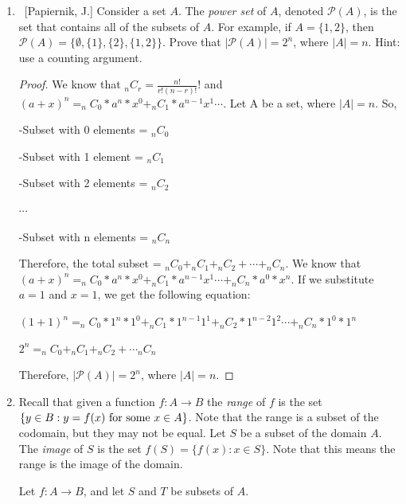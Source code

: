 \documentclass[10pt]{article}
\begin{document}
\begin{enumerate}
\item  ~[Papiernik, J.] Consider a set $A$.  The \emph{power set} of $A$, denoted $\mathcal{P}(A)$, is the set that contains all of the subsets of $A$.  For example, if $A = \{ 1, 2 \}$, then $\mathcal{P}(A) = \{ \emptyset, \{1\}, \{2\}, \{1,2\} \}$.  Prove that $|\mathcal{P}(A)| = 2^n$, where $|A| = n$.  Hint: use a counting argument.
\begin{proof}
We know that $_n C_r = \frac{n!}{r!(n-r)!}!$ and $(a+x)^n = _n C_0*a^n*x^0+_n C_1*a^{n-1}x^1 \cdots$.  Let A be a set, where $|A| = n$.  So, 
\begin{center}
\par \medskip
-Subset with 0 elements = $_n C_0$
\par \medskip
-Subset with 1 element = $_n C_1$
\par \medskip
-Subset with 2 elements = $_n C_2$
\par \medskip
$\cdots$
\par \medskip
-Subset with n elements = $_n C_n$
\par \medskip
\end{center}
Therefore, the total subset = $_n C_0 + _n C_1 + _n C_2 + \cdots + _n C_n$.  We know that $(a+x)^n = _n C_0*a^n*x^0+_n C_1*a^{n-1}x^1 \cdots + _n C_n*a^0*x^n$.  If we substitute $a = 1$ and $x = 1$, we get the following equation: 
\begin{center}
\par \medskip
    $(1+1)^n = _n C_0*1^n*1^0+_n C_1*1^{n-1}1^1 + _n C_2*1^{n-2}1^2 \cdots +  _n C_n*1^0*1^n$
    \par \medskip
    $2^n = _n C_0 + _n C_1 + _n C_2 + \cdots _n C_n$
    \par \medskip
\end{center}
Therefore, $|\mathcal{P}(A)| = 2^n$, where $|A| = n$.
\end{proof}

\item  Recall that given a function $f:A \to B$ the \emph{range} of $f$ is the set $\{ y \in B: y=f(x) \textnormal{ for some } x \in A\}$.  Note that the range is a subset of the codomain, but they may not be equal.  Let $S$ be a subset of the domain $A$.  The \emph{image} of $S$ is the set $f(S) = \{f(x): x \in S \}$.  Note that this means the range is the image of the domain.

Let $f:A \to B$, and let $S$ and $T$ be subsets of $A$.

	\begin{enumerate}
	

\end{enumerate}
\end{enumerate}
\end{document}
